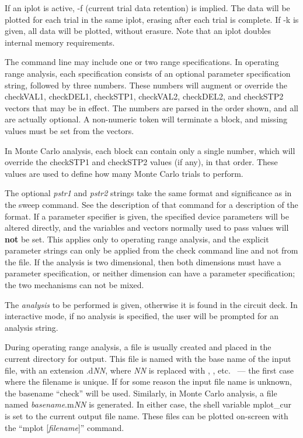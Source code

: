 If an {\cb iplot} is active, {\vt -f} (current trial data retention)
is implied.  The data will be plotted for each trial in the same
{\cb iplot}, erasing after each trial is complete.  If {\vt -k} is
given, all data will be plotted, without erasure.  Note that an
iplot doubles internal memory requirements.

The command line may include one or two range specifications.  In
operating range analysis, each specification consists of an optional
parameter specification string, followed by three numbers.  These
numbers will augment or override the {\vt checkVAL1}, {\vt checkDEL1},
{\vt checkSTP1}, {\vt checkVAL2}, {\vt checkDEL2}, and {\vt checkSTP2}
vectors that may be in effect.  The numbers are parsed in the order
shown, and all are actually optional.  A non-numeric token will
terminate a block, and missing values must be set from the vectors.

In Monte Carlo analysis, each block can contain only a single number,
which will override the {\vt checkSTP1} and {\vt checkSTP2} values (if
any), in that order.  These values are used to define how many Monte
Carlo trials to perform.

The optional {\it pstr1} and {\it pstr2} strings take the same format
and significance as in the {\cb sweep} command.  See the description
of that command for a description of the format.  If a parameter
specifier is given, the specified device parameters will be altered
directly, and the variables and vectors normally used to pass values
will {\bf not} be set.  This applies only to operating range analysis,
and the explicit parameter strings can only be applied from the {\cb
check} command line and not from the file.  If the analysis is two
dimensional, then both dimensions must have a parameter specification,
or neither dimension can have a parameter specification; the two
mechanisms can not be mixed.

The {\it analysis} to be performed is given, otherwise it is found in
the circuit deck.  In interactive mode, if no analysis is specified,
the user will be prompted for an analysis string.

During operating range analysis, a file is usually created and placed
in the current directory for output.  This file is named with the base
name of the input file, with an extension {\vt .d}{\it NN}, where {\it
NN} is replaced with {}, {}, etc.~ --- the first case
where the filename is unique.  If for some reason the input file name
is unknown, the basename ``check'' will be used.  Similarly, in Monte
Carlo analysis, a file named {\it basename\/}.{\vt m}{\it NN} is
generated.  In either case, the shell variable {\et mplot\_cur} is set
to the current output file name.  These files can be plotted on-screen
with the ``{\vt mplot [{\it filename\/}]}'' command.

